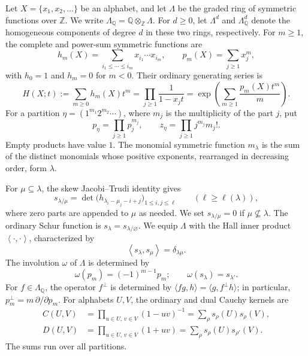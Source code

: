 \documentclass[12pt,reqno,a4paper]{amsart}
\numberwithin{equation}{section}
\numberwithin{figure}{section}
\theoremstyle{plain}
\theoremstyle{definition}
\newcommand{\inner}[2]{\left\langle #1,#2\right\rangle}
\begin{document}
Let $X=\{x_1,x_2,\ldots\}$ be an alphabet, and let $\Lambda$ be the
graded ring of symmetric functions over $\mathbb Z$.  We write
$\Lambda_{\mathbb Q}=\mathbb Q\otimes_{\mathbb Z}\Lambda$.  For
$d\geq0$, let $\Lambda^d$ and $\Lambda_{\mathbb Q}^d$ denote the
homogeneous components of degree $d$ in these two rings, respectively.
For
$m\geq1$, the complete and power-sum symmetric functions are
\[
 h_m(X)=\sum_{i_1\leq\cdots\leq i_m}x_{i_1}\cdots x_{i_m},
 \qquad
 p_m(X)=\sum_{j\geq1}x_j^m,
\]
with $h_0=1$ and $h_m=0$ for $m<0$.  Their ordinary generating
series is
\begin{equation}\label{eq:ordinary-complete-generating}
 H(X;t):=\sum_{m\geq0}h_m(X)t^m
 =\prod_{j\geq1}\frac{1}{1-x_jt}
 =\exp\!\left(\sum_{m\geq1}\frac{p_m(X)t^m}{m}\right).
\end{equation}
For a partition $\eta=(1^{m_1}2^{m_2}\cdots)$, where $m_j$ is the
multiplicity of the part $j$, put
\[
 p_\eta=\prod_{j\geq1}p_j^{m_j},\qquad
 z_\eta=\prod_{j\geq1}j^{m_j}m_j!.
\]
Empty products have value $1$.
The monomial symmetric function $m_\lambda$ is the sum of the
distinct monomials whose positive exponents, rearranged in decreasing
order, form $\lambda$.

For $\mu\subseteq\lambda$, the skew Jacobi--Trudi identity gives
\begin{equation}\label{eq:refaudit-skew-jacobi-trudi}
 s_{\lambda/\mu}
 =\det\bigl(h_{\lambda_i-\mu_j-i+j}\bigr)_{1\leq i,j\leq\ell}
 \qquad(\ell\geq\ell(\lambda)),
\end{equation}
where zero parts are appended to $\mu$ as needed.  We set
$s_{\lambda/\mu}=0$ if $\mu\not\subseteq\lambda$.
The ordinary Schur
function is $s_\lambda=s_{\lambda/\varnothing}$.  We equip $\Lambda$
with the Hall inner product $\inner{\cdot}{\cdot}$, characterized by
\[
 \inner{s_\lambda}{s_\mu}=\delta_{\lambda\mu}.
\]
The involution $\omega$ of $\Lambda$ is determined by
\begin{equation}\label{eq:refaudit-omega}
\omega(p_m)=(-1)^{m-1}p_m;
\qquad \omega(s_\lambda)=s_{\lambda'}.
\end{equation}
For $f\in\Lambda_{\mathbb Q}$, the operator $f^\perp$ is determined by
$\langle f g,h\rangle=\langle g,f^\perp h\rangle$; in particular,
$p_m^\perp=m\,\partial/\partial p_m$.
For alphabets $U,V$, the ordinary and dual Cauchy kernels are
\begin{align}
 C(U,V)&=\prod_{u\in U,\,v\in V}(1-uv)^{-1}
       =\sum_\rho s_\rho(U)s_\rho(V),\label{eq:refaudit-ordinary-cauchy}\\
 D(U,V)&=\prod_{u\in U,\,v\in V}(1+uv)
       =\sum_\rho s_\rho(U)s_{\rho'}(V).\label{eq:refaudit-dual-cauchy}
\end{align}
The sums run over all partitions.
\end{document}
